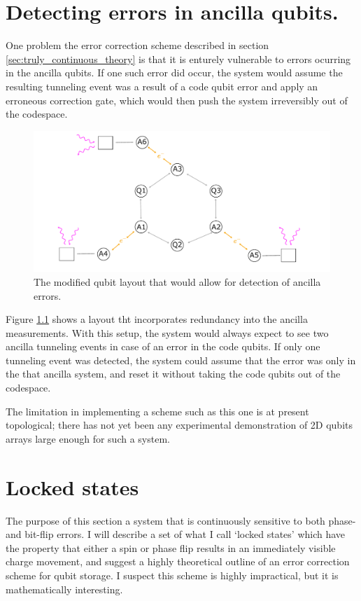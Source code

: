 \documentclass{report}
\begin{document}
\begin{appendices}
\chapter{Detecting errors in ancilla qubits.}
One problem the error correction scheme described in section \ref{sec:truly_continuous_theory} is that it is enturely vulnerable to errors ocurring in the ancilla qubits. If one such error did occur, the system would assume the resulting tunneling event was a result of a code qubit error and apply an erroneous correction gate, which would then push the system irreversibly out of the codespace.
\begin{figure}[h]
    \centering
    \includegraphics[scale = 0.9]{Figures/9q.pdf}
    \caption{The modified qubit layout that would allow for detection of ancilla errors.}
    \label{fig:9qubitlayout}
\end{figure}
Figure \ref{fig:9qubitlayout} shows a layout tht incorporates redundancy into the ancilla measurements. With this setup, the system would always expect to see two ancilla tunneling events in case of an error in the code qubits. If only one tunneling event was detected, the system could assume that the error was only in the that ancilla system, and reset it without taking the code qubits out of the codespace.

The limitation in implementing a scheme such as this one is at present topological; there has not yet been any experimental demonstration of 2D qubits arrays large enough for such a system.
\chapter{Locked states}
The purpose of this section a system that is continuously sensitive to both phase- and bit-flip errors. I will describe a set of what I call `locked states' which have the property that either a spin or phase flip results in an immediately visible charge movement, and suggest a highly theoretical outline of an error correction scheme for qubit storage. I suspect this scheme is highly impractical, but it is mathematically interesting.


\end{appendices}
\end{document}
